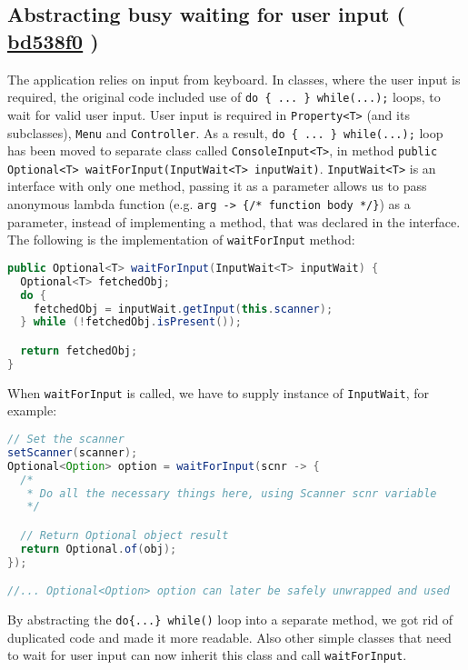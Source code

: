 \documentclass{article}
\newcommand{\code}[1]{\texttt{#1}}
\newcommand{\gh}[1]{%
  \href{https://github.com/awave1/assessment-loan-system/commit/#1}{#1}%
}
\begin{document}
\subsection*{Abstracting busy waiting for user input (\gh{bd538f0})}
The application relies on input from keyboard. In classes, where the user input is required, the original code included use of \code{do \{ ... \} while(...);} loops, to wait for valid user input. User input is required in \code{Property<T>} (and its subclasses), \code{Menu} and \code{Controller}. As a result, \code{do \{ ... \} while(...);} loop has been moved to separate class called \code{ConsoleInput<T>}, in method \code{public Optional<T> waitForInput(InputWait<T> inputWait)}. \code{InputWait<T>} is an interface with only one method, passing it as a parameter allows us to pass anonymous lambda function (e.g. \code{arg -> \{/* function body */\}}) as a parameter, instead of implementing a method, that was declared in the interface. The following is the implementation of \code{waitForInput} method:

\begin{lstlisting}[language=Java]
public Optional<T> waitForInput(InputWait<T> inputWait) {
  Optional<T> fetchedObj;
  do {
    fetchedObj = inputWait.getInput(this.scanner);
  } while (!fetchedObj.isPresent());

  return fetchedObj;
}
\end{lstlisting}

When \code{waitForInput} is called, we have to supply instance of \code{InputWait}, for example:

\begin{lstlisting}[language=Java]
// Set the scanner
setScanner(scanner);
Optional<Option> option = waitForInput(scnr -> {
  /*
   * Do all the necessary things here, using Scanner scnr variable
   */

  // Return Optional object result
  return Optional.of(obj);
});

//... Optional<Option> option can later be safely unwrapped and used
\end{lstlisting}

By abstracting the \code{do\{...\} while()} loop into a separate method, we got rid of duplicated code and made it more readable. Also other simple classes that need to wait for user input can now inherit this class and call \code{waitForInput}.
\end{document}
